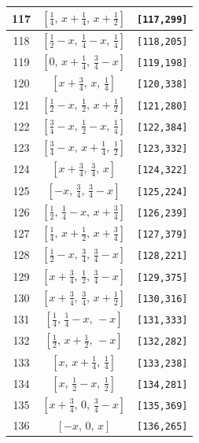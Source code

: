 \documentclass[fleqn,8pt]{jsarticle}
\begin{document}
\begin{longtable}{ccc}
117 & $\left[ \frac{1}{4},\, x + \frac{1}{4},\, x + \frac{1}{2} \right]$ & {\tt [117,299]} \\ \hline
118 & $\left[ \frac{1}{2} - x,\, \frac{1}{4} - x,\, \frac{1}{4} \right]$ & {\tt [118,205]} \\ \hline
119 & $\left[ 0,\, x + \frac{1}{4},\, \frac{3}{4} - x \right]$ & {\tt [119,198]} \\ \hline
120 & $\left[ x + \frac{3}{4},\, x,\, \frac{1}{4} \right]$ & {\tt [120,338]} \\ \hline
121 & $\left[ \frac{1}{2} - x,\, \frac{1}{2},\, x + \frac{1}{2} \right]$ & {\tt [121,280]} \\ \hline
122 & $\left[ \frac{3}{4} - x,\, \frac{1}{2} - x,\, \frac{1}{4} \right]$ & {\tt [122,384]} \\ \hline
123 & $\left[ \frac{3}{4} - x,\, x + \frac{1}{4},\, \frac{1}{2} \right]$ & {\tt [123,332]} \\ \hline
124 & $\left[ x + \frac{3}{4},\, \frac{3}{4},\, x \right]$ & {\tt [124,322]} \\ \hline
125 & $\left[ - x,\, \frac{3}{4},\, \frac{3}{4} - x \right]$ & {\tt [125,224]} \\ \hline
126 & $\left[ \frac{1}{2},\, \frac{1}{4} - x,\, x + \frac{3}{4} \right]$ & {\tt [126,239]} \\ \hline
127 & $\left[ \frac{1}{4},\, x + \frac{1}{2},\, x + \frac{3}{4} \right]$ & {\tt [127,379]} \\ \hline
128 & $\left[ \frac{1}{2} - x,\, \frac{3}{4},\, \frac{3}{4} - x \right]$ & {\tt [128,221]} \\ \hline
129 & $\left[ x + \frac{3}{4},\, \frac{1}{2},\, \frac{3}{4} - x \right]$ & {\tt [129,375]} \\ \hline
130 & $\left[ x + \frac{3}{4},\, \frac{3}{4},\, x + \frac{1}{2} \right]$ & {\tt [130,316]} \\ \hline
131 & $\left[ \frac{1}{4},\, \frac{1}{4} - x,\, - x \right]$ & {\tt [131,333]} \\ \hline
132 & $\left[ \frac{1}{2},\, x + \frac{1}{2},\, - x \right]$ & {\tt [132,282]} \\ \hline
133 & $\left[ x,\, x + \frac{1}{4},\, \frac{1}{4} \right]$ & {\tt [133,238]} \\ \hline
134 & $\left[ x,\, \frac{1}{2} - x,\, \frac{1}{2} \right]$ & {\tt [134,281]} \\ \hline
135 & $\left[ x + \frac{3}{4},\, 0,\, \frac{3}{4} - x \right]$ & {\tt [135,369]} \\ \hline
136 & $\left[ - x,\, 0,\, x \right]$ & {\tt [136,265]} \\ \hline

\end{longtable}
\end{document}
